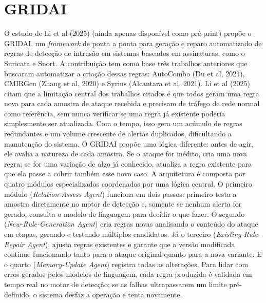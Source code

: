 \section{GRIDAI}

O estudo de Li et al (2025) (ainda apenas disponível como pré-print) propõe o GRIDAI, um \textit{framework} de ponta a ponta para geração e reparo automatizado de regras de detecção de intrusão em sistemas baseados em assinaturas, como o \gls{Suricata} e \gls{Snort}. 
A contribuição tem como base três trabalhos anteriores que buscaram automatizar a criação dessas regras: 
AutoCombo (Du et al, 2021), CMIRGen (Zhang et al, 2020) e Syrius (Alcantara et al, 2021). 
Li et al (2025) citam que a limitação central dos trabalhos citados é que todos geram uma regra nova para cada amostra de ataque recebida e precisam de tráfego de rede normal como referência, sem nunca verificar se uma regra já existente poderia simplesmente ser atualizada. 
Com o tempo, isso gera um acúmulo de regras redundantes e um volume crescente de alertas duplicados, dificultando a manutenção do sistema. 
O GRIDAI propõe uma lógica diferente: antes de agir, ele avalia a natureza de cada amostra. 
Se o ataque for inédito, cria uma nova regra; se for uma variação de algo já conhecido, atualiza a regra existente para que ela passe a cobrir também esse novo caso. 
A arquitetura é composta por quatro módulos especializados coordenados por uma lógica central. 
O primeiro módulo (\textit{Relation-Assess Agent}) funciona em dois passos: primeiro testa a amostra diretamente no motor de detecção e, somente se nenhum alerta for gerado, consulta o modelo de linguagem para decidir o que fazer. 
O segundo (\textit{New-Rule-Generation Agent}) cria regras novas analisando o conteúdo do ataque em etapas, gerando e testando múltiplos candidatos. 
Já o terceiro (\textit{Existing-Rule-Repair Agent}), ajusta regras existentes e garante que a versão modificada continue funcionando tanto para o ataque original quanto para a nova variante. 
E o quarto (\textit{Memory-Update Agent}) registra todas as alterações. 
Para lidar com erros gerados pelos modelos de linguagem, cada regra produzida é validada em tempo real no motor de detecção; 
se as falhas ultrapassarem um limite pré-definido, o sistema desfaz a operação e tenta novamente.

